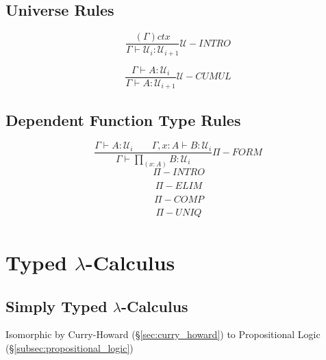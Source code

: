 \subsection{Universe Rules}\label{subsec:universe_rules}

\[
    {
        \frac
        {(\Gamma) ctx}
        {\Gamma \vdash \mathcal{U}_i : \mathcal{U}_{i+1}}
    } \mathcal{U}-INTRO
\]

\[
    {
        \frac
        {\Gamma \vdash A : \mathcal{U}_i}
        {\Gamma \vdash A : \mathcal{U}_{i+1}}
    } \mathcal{U}-CUMUL
\]



\subsection{Dependent Function Type Rules}\label{subsec:dependent_rules}

\[
    {
        \frac
        {\Gamma \vdash A : \mathcal{U}_i \;\;\;\;\;\;\;
        \Gamma,x:A \vdash B : \mathcal{U}_i}
        {\Gamma \vdash \prod_{(x:A)} B : \mathcal{U}_i}
    } \Pi-FORM
\]\[
    {
        \frac
        {}
        {}
    } \Pi-INTRO
\]\[
    {
        \frac
        {}
        {}
    } \Pi-ELIM
\]\[
    {
        \frac
        {}
        {}
    } \Pi-COMP
\]\[
    {
        \frac
        {}
        {}
    } \Pi-UNIQ
\]



\section{Typed $\lambda$-Calculus}\label{sec:typed_lambda}

\subsection{Simply Typed $\lambda$-Calculus}\label{subsec:simply_typed}

Isomorphic by Curry-Howard (\S\ref{sec:curry_howard}) to
Propositional Logic (\S\ref{subsec:propositional_logic})

